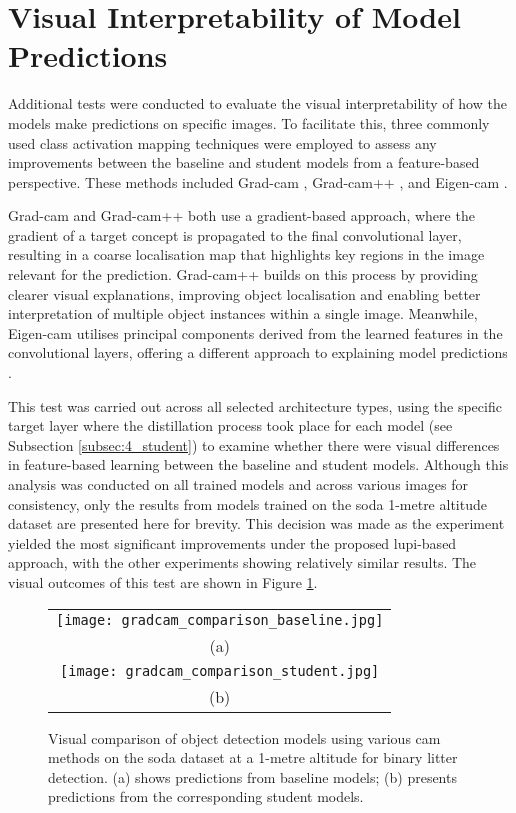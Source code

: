 \section{Visual Interpretability of Model Predictions}
\label{sec:5_interpretability}

Additional tests were conducted to evaluate the visual interpretability of how the models make predictions on specific images. To facilitate this, three commonly used class activation mapping techniques were employed to assess any improvements between the baseline and student models from a feature-based perspective. These methods included Grad-\gls{cam} \cite{gradcam}, Grad-\gls{cam}++ \cite{gradcam_plus_plus}, and Eigen-\gls{cam} \cite{eigencam}.

Grad-\gls{cam} and Grad-\gls{cam}++ both use a gradient-based approach, where the gradient of a target concept is propagated to the final convolutional layer, resulting in a coarse localisation map that highlights key regions in the image relevant for the prediction. Grad-\gls{cam}++ builds on this process by providing clearer visual explanations, improving object localisation and enabling better interpretation of multiple object instances within a single image\cite{gradcam, gradcam_plus_plus}. Meanwhile, Eigen-\gls{cam} utilises principal components derived from the learned features in the convolutional layers, offering a different approach to explaining model predictions \cite{eigencam}. 


This test was carried out across all selected architecture types, using the specific target layer where the distillation process took place for each model (see Subsection \ref{subsec:4_student}) to examine whether there were visual differences in feature-based learning between the baseline and student models. Although this analysis was conducted on all trained models and across various images for consistency, only the results from models trained on the \gls{soda} 1-metre altitude dataset are presented here for brevity. This decision was made as the experiment yielded the most significant improvements under the proposed \gls{lupi}-based approach, with the other experiments showing relatively similar results. The visual outcomes of this test are shown in Figure \ref{fig:gradcam_comparison}.

\begin{figure}[p]
    \centering
    \begin{tabular}{c}
        \texttt{[image: gradcam\_comparison\_baseline.jpg]} \\
        \small (a) \\
        \addlinespace[1em]
        \texttt{[image: gradcam\_comparison\_student.jpg]} \\
        \small (b) \\
    \end{tabular}
    \caption{Visual comparison of object detection models using various \gls{cam} methods on the \gls{soda} dataset at a 1-metre altitude for binary litter detection. (a) shows predictions from baseline models; (b) presents predictions from the corresponding student models.}
    \label{fig:gradcam_comparison}
\end{figure}

